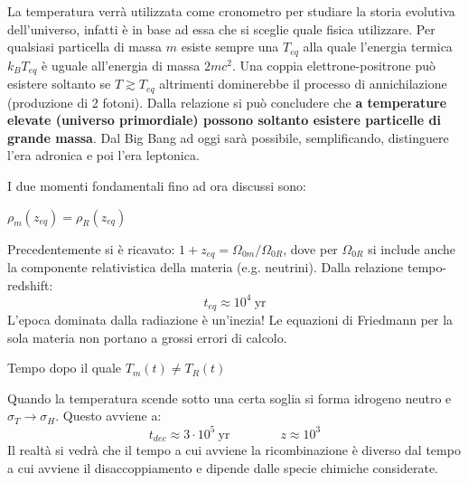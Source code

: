 \vspace{1em}
La temperatura verrà utilizzata come cronometro per studiare la storia evolutiva dell'universo, infatti è in base ad essa che si sceglie quale fisica utilizzare. Per qualsiasi particella di massa $m$ esiste sempre una $T_{eq}$ alla quale l'energia termica $k_BT_{eq}$ è uguale all'energia di massa $2m c^2$. Una coppia elettrone-positrone può esistere soltanto se $T\gtrsim T_{eq}$ altrimenti dominerebbe il processo di annichilazione (produzione di 2 fotoni). Dalla relazione si può concludere che \textbf{a temperature elevate (universo primordiale) possono soltanto esistere particelle di grande massa}. Dal Big Bang ad oggi sarà possibile, semplificando, distinguere l'era adronica e poi l'era leptonica.
\vspace{2em}

I due momenti fondamentali fino ad ora discussi sono:
\begin{example}
    $\rho_m (z_{eq})=\rho_R(z_{eq})$
\end{example}
Precedentemente si è ricavato: $1+z_{eq}=\Omega_{0m}/\Omega_{0R}$, dove per $\Omega_{0R}$ si include anche la componente relativistica della materia (e.g. neutrini). Dalla relazione tempo-redshift:
$$
t_{eq} \approx 10^4 ~\mathrm{yr}
$$
L'epoca dominata dalla radiazione è un'inezia! Le equazioni di Friedmann per la sola materia non portano a grossi errori di calcolo.

\begin{example}[Disaccoppiamento]
    Tempo dopo il quale $T_m(t)\neq T_R(t)$
\end{example}
Quando la temperatura scende sotto una certa soglia si forma idrogeno neutro e $\sigma_T \rightarrow \sigma_H$. Questo avviene a:
$$
t_{dec} \approx 3\cdot 10^5 ~\mathrm{yr} \qquad\qquad z \approx 10^3
$$
Il realtà si vedrà che il tempo a cui avviene la ricombinazione è diverso dal tempo a cui avviene il disaccoppiamento e dipende dalle specie chimiche considerate.

